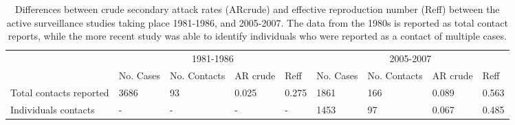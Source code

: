 
\begin{table} %

\centering %
\caption{Differences between crude secondary attack rates (ARcrude) and effective reproduction number (Reff) between the active surveillance studies taking place 1981-1986, and 2005-2007. The data from the 1980s is reported as total contact reports, while the more recent study was able to identify individuals who were reported as a contact of multiple cases.}
\begin{tabularx}{400pt}{lXXXXXXXX} %
\toprule %
& \multicolumn{4}{c}{1981-1986} & \multicolumn{4}{c}{2005-2007} \\ %
\cmidrule(r){2-5} %
\cmidrule(l){6-9}
 & No. Cases & No. Contacts & AR crude & Reff & No. Cases & No. Contacts & AR crude & Reff\\ %
\toprule %
Total contacts reported & 3686 & 93 & 0.025 & 0.275 & 1861 & 166 & 0.089 & 0.563\\ 
Individuals contacts & - & - & - & - & 1453 & 97 & 0.067 & 0.485\\
\bottomrule %
\end{tabularx}
\label{table1} %
\end{table}

